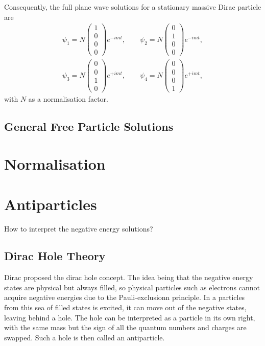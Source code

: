 \documentclass[11pt]{penrose}
\begin{document}
Consequently, the full plane wave solutions for a stationary massive Dirac particle are
\begin{gather}
    \psi_1 = N \begin{pmatrix}1 \\ 0 \\ 0 \\ 0\end{pmatrix} e^{-imt}, \qquad
    \psi_2 = N \begin{pmatrix}0 \\ 1 \\ 0 \\ 0\end{pmatrix} e^{-imt},\\
    \psi_3 = N \begin{pmatrix}0 \\ 0 \\ 1 \\ 0\end{pmatrix} e^{+imt}, \qquad
    \psi_4 = N \begin{pmatrix}0 \\ 0 \\ 0 \\ 1\end{pmatrix} e^{+imt},
\end{gather}
with $N$ as a normalisation factor.

\subsection{General Free Particle Solutions}

\section{Normalisation}

\section{Antiparticles}
How to interpret the negative energy solutions?

\subsection{Dirac Hole Theory}
Dirac proposed the dirac hole concept. The idea being that the negative energy states are physical but always filled, so physical particles such as electrons cannot acquire negative energies due to the Pauli-exclusionn principle. In a particles from this sea of filled states is excited, it can move out of the negative states, leaving behind a hole. The hole can be interpreted as a particle in its own right, with the same mass but the sign of all the quantum numbers and charges are swapped. Such a hole is then called an antiparticle.
\end{document}
